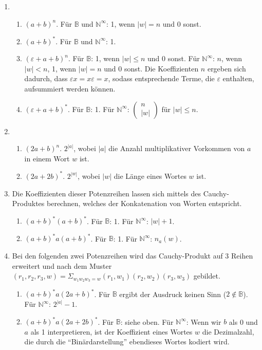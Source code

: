 \documentclass[]{scrartcl}
\newcommand{\matr}[2]{\left(\begin{array}{#1}#2\end{array}\right)}
\newcommand{\e}{\varepsilon}
\begin{document}
\begin{enumerate}
	\item
		\begin{enumerate}
			\item $(a+b)^n$. Für $\mathbb{B}$ und $\mathbb{N^\infty}$: 1, wenn $|w|=n$ und 0 sonst.
			\item $(a+b)^*$. Für $\mathbb{B}$ und $\mathbb{N^\infty}$: 1.
			\item $(\e + a+b)^n$. Für $\mathbb{B}$: 1, wenn $|w|\leq n$ und 0 sonst. Für $\mathbb{N^\infty}$: $n$, wenn $|w|<n$, 1, wenn $|w|=n$ und 0 sonst. Die Koeffizienten $n$ ergeben sich dadurch, dass $\e x = x \e = x$, sodass entsprechende Terme, die $\e$ enthalten, aufsummiert werden können.
			\item $(\e + a+b)^*$. Für $\mathbb{B}$: 1. Für $\mathbb{N^\infty}$: $\matr{l}{n\\|w|}$ für $|w|\leq n$.
		\end{enumerate}
		
	\item
		\begin{enumerate}
			\item $(2a+b)^n$. $2^{|a|}$, wobei $|a|$ die Anzahl multiplikativer Vorkommen von $a$ in einem Wort $w$ ist.
			\item $(2a+2b)^*$. $2^{|w|}$, wobei $|w|$ die Länge eines Wortes $w$ ist.
		\end{enumerate}
	\item
		Die Koeffizienten dieser Potenzreihen lassen sich mittels des Cauchy-Produktes berechnen, welches der Konkatenation von Worten entspricht.
		\begin{enumerate}
			\item $(a+b)^*(a+b)^*$. Für $\mathbb{B}$: 1. Für $\mathbb{N^\infty}$: $|w|+1$.
			\item $(a+b)^*a(a+b)^*$. Für $\mathbb{B}$: 1. Für $\mathbb{N^\infty}$: $n_a(w)$.
		\end{enumerate}
	\item Bei den folgenden zwei Potenzreihen wird das Cauchy-Produkt auf 3 Reihen erweitert und nach dem Muster $(r_1,r_2,r_3,w) = \Sigma_{w_1w_2w_3 = w} (r_1,w_1)(r_2,w_2)(r_3,w_3)$ gebildet.
		\begin{enumerate}
			\item $(a+b)^*a(2a+b)^*$. Für $\mathbb{B}$ ergibt der Ausdruck keinen Sinn ($2 \notin \mathbb{B}$). Für $\mathbb{N^\infty}$: $2^{|a|}-1$.
			\item $(a+b)^*a(2a+2b)^*$. Für $\mathbb{B}$: siehe oben. Für $\mathbb{N^\infty}$: Wenn wir $b$ als 0 und $a$ als 1 interpretieren, ist der Koeffizient eines Wortes $w$ die Dezimalzahl, die durch die ``Binärdarstellung'' ebendieses Wortes kodiert wird.
		\end{enumerate}
\end{enumerate}
\end{document}

